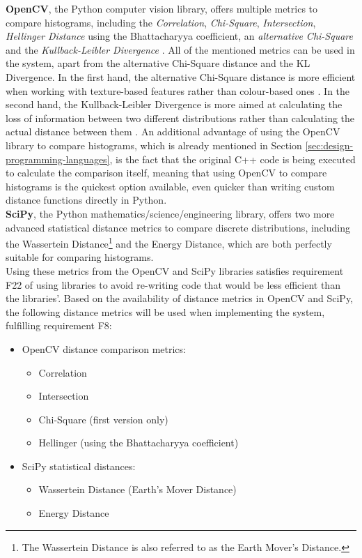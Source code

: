 \textbf{OpenCV}, the Python computer vision library, offers multiple metrics to compare histograms, including the \textit{Correlation}, \textit{Chi-Square}, \textit{Intersection}, \textit{Hellinger Distance} using the Bhattacharyya coefficient, an \textit{alternative Chi-Square} and the \textit{Kullback-Leibler Divergence} \cite{opencv-histcomp}. All of the mentioned metrics can be used in the system, apart from the alternative Chi-Square distance and the KL Divergence. In the first hand, the alternative Chi-Square distance is more efficient when working with texture-based features rather than colour-based ones \cite{puzicha1997non}. In the second hand, the Kullback-Leibler Divergence is more aimed at calculating the loss of information between two different distributions rather than calculating the actual distance between them \cite{kurt2007kldivergence}. An additional advantage of using the OpenCV library to compare histograms, which is already mentioned in Section \ref{sec:design-programming-languages}, is the fact that the original C++ code is being executed to calculate the comparison itself, meaning that using OpenCV to compare histograms is the quickest option available, even quicker than writing custom distance functions directly in Python.\\

\textbf{SciPy}, the Python mathematics/science/engineering library, offers two more advanced statistical distance metrics to compare discrete distributions, including the Wassertein Distance\footnote{The Wassertein Distance is also referred to as the Earth Mover’s Distance.} and the Energy Distance, which are both perfectly suitable for comparing histograms.\\

Using these metrics from the OpenCV and SciPy libraries satisfies requirement F22 of using libraries to avoid re-writing code that would be less efficient than the libraries'. Based on the availability of distance metrics in OpenCV and SciPy, the following distance metrics will be used when implementing the system, fulfilling requirement F8:

\begin{itemize}
    \item OpenCV distance comparison metrics:
    \begin{itemize}
        \item Correlation
        \item Intersection
        \item Chi-Square (first version only)
        \item Hellinger (using the Bhattacharyya coefficient)
    \end{itemize}
    \item SciPy statistical distances:
    \begin{itemize}
        \item Wassertein Distance (Earth's Mover Distance)
        \item Energy Distance
    \end{itemize}
   
\end{itemize}

